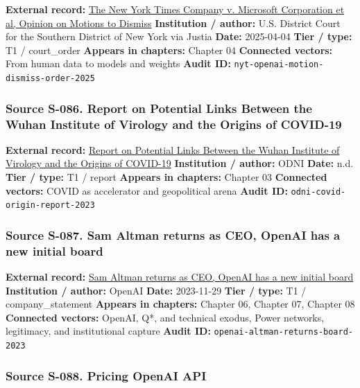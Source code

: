 \documentclass[
  american,
  11pt,
  letterpaper,
]{article}
\begin{document}
\textbf{External record:}
\href{https://cases.justia.com/federal/district-courts/new-york/nysdce/1\%3A2023cv11195/612697/514/0.pdf?ts=1743868265}{The
New York Times Company v. Microsoft Corporation et al, Opinion on
Motions to Dismiss} \textbf{Institution / author:} U.S. District Court
for the Southern District of New York via Justia \textbf{Date:}
2025-04-04 \textbf{Tier / type:} T1 / court\_order \textbf{Appears in
chapters:} Chapter 04 \textbf{Connected vectors:} From human data to
models and weights \textbf{Audit ID:}
\texttt{nyt-openai-motion-dismiss-order-2025}

\subsubsection{Source S-086. Report on Potential Links Between the Wuhan
Institute of Virology and the Origins of
COVID-19}\label{source-s-086-report-on-potential-links-between-the-wuhan-institute-of-virology-and-the-origins-of-covid-19}

\textbf{External record:}
\href{https://www.dni.gov/files/ODNI/documents/assessments/Report-on-Potential-Links-Between-the-Wuhan-Institute-of-Virology-and-the-Origins-of-COVID-19-20230623.pdf}{Report
on Potential Links Between the Wuhan Institute of Virology and the
Origins of COVID-19} \textbf{Institution / author:} ODNI \textbf{Date:}
n.d. \textbf{Tier / type:} T1 / report \textbf{Appears in chapters:}
Chapter 03 \textbf{Connected vectors:} COVID as accelerator and
geopolitical arena \textbf{Audit ID:}
\texttt{odni-covid-origin-report-2023}

\subsubsection{Source S-087. Sam Altman returns as CEO, OpenAI has a new
initial
board}\label{source-s-087-sam-altman-returns-as-ceo-openai-has-a-new-initial-board}

\textbf{External record:}
\href{https://openai.com/index/sam-altman-returns-as-ceo-openai-has-a-new-initial-board/}{Sam
Altman returns as CEO, OpenAI has a new initial board}
\textbf{Institution / author:} OpenAI \textbf{Date:} 2023-11-29
\textbf{Tier / type:} T1 / company\_statement \textbf{Appears in
chapters:} Chapter 06, Chapter 07, Chapter 08 \textbf{Connected
vectors:} OpenAI, Q*, and technical exodus, Power networks, legitimacy,
and institutional capture \textbf{Audit ID:}
\texttt{openai-altman-returns-board-2023}

\subsubsection{Source S-088. Pricing \textbar{} OpenAI
API}\label{source-s-088-pricing-openai-api}
\end{document}
